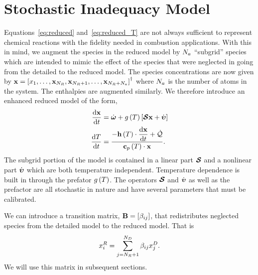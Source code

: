 \section{Stochastic Inadequacy Model}
Equations~\eqref{eq:reduced} and~\eqref{eq:reduced_T} are not always sufficient to represent chemical reactions with the fidelity needed in combustion applications.  With this in mind, we augment the species in the reduced model by $N_{a}$ ``subgrid'' species which are intended to mimic the effect of the species that were neglected in going from the detailed to the reduced model.  The species concentrations are now given by $\mathbf{x} = \left[x_{1}, \ldots, \mathbf{x}_{N_{R}}, \mathbf{x}_{N_{R}+1}, \ldots, \mathbf{x}_{N_{R} + N_{a}}\right]^{\dagger}$ where $N_{a}$ is the number of atoms in the system.  The enthalpies are augmented similarly.  We therefore introduce an enhanced reduced model of the form,
\begin{align}
  \frac{\mathrm{d} \mathbf{x}}{\mathrm{d} t} &= \dot{\boldsymbol{\omega}} + g\left(T\right)\left[\boldsymbol{\mathcal{S}} \mathbf{x} + \dot{\boldsymbol{\upsilon}}\right] \\
  \frac{\mathrm{d} T}{\mathrm{d} t}  &= \frac{-\displaystyle \mathbf{h}\left(T\right)\cdot\frac{\mathrm{d} \mathbf{x}}{\mathrm{d} t} + \dot{\mathcal{Q}}}{\displaystyle \mathbf{c}_{p}\left(T\right)\cdot\mathbf{x}}.
\end{align}
The subgrid portion of the model is contained in a linear part $\boldsymbol{\mathcal{S}}$ and a nonlinear part $\dot{\boldsymbol{\upsilon}}$ which are both temperature independent.  Temperature dependence is built in through the prefator $g\left(T\right)$.  The operators $\boldsymbol{\mathcal{S}}$ and $\dot{\boldsymbol{\upsilon}}$ as well as the prefactor are all stochastic in nature and have several parameters that must be calibrated.

We can introduce a transition matrix, $\mathbf{B} = \left[\beta_{ij}\right]$, that redistributes neglected species from the detailed model to the reduced model.  That is
\begin{align}
  x_{i}^{R} = \sum_{j=N_{R} + 1}^{N_{D}}{\beta_{ij}x_{j}^{D}}. \label{eq:transition}
\end{align}
We will use this matrix in subsequent sections.
